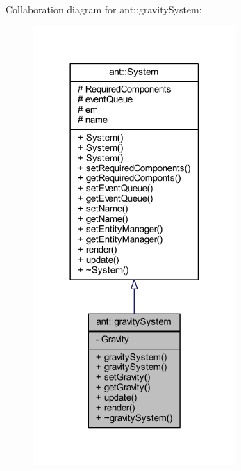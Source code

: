 Collaboration diagram for ant\+:\+:gravity\+System\+:
\nopagebreak
\begin{figure}[H]
\begin{center}
\leavevmode
\includegraphics[width=218pt]{d6/dbb/classant_1_1gravity_system__coll__graph}
\end{center}
\end{figure}
